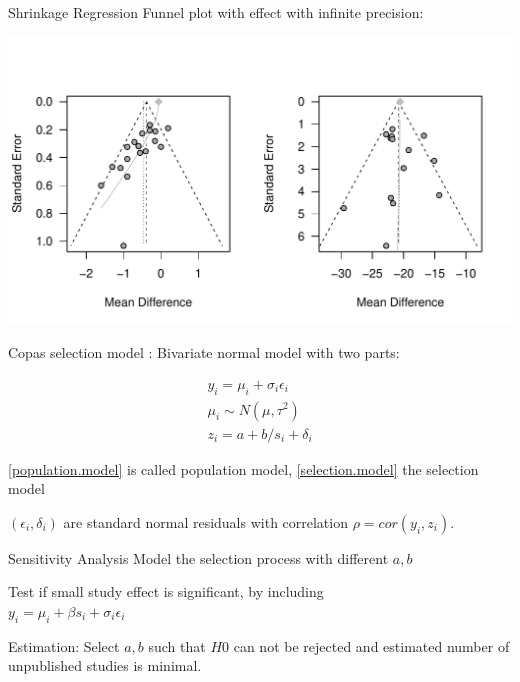 \documentclass[english]{beamer}\usepackage[]{graphicx}\usepackage[]{color}
\makeatletter
\def\maxwidth{ %
  \ifdim\Gin@nat@width>\linewidth
    \linewidth
  \else
    \Gin@nat@width
  \fi
}
\newenvironment{knitrout}{}{} %
\makeatother
\begin{document}
\begin{frame}[fragile]{Shrinkage Regression}
Funnel plot with effect with infinite precision:

\vspace{-1.1cm}
\begin{knitrout}
\color{fgcolor}
\includegraphics[width=\maxwidth]{figure/unnamed-chunk-11-1} 

\end{knitrout}
\end{frame}



\begin{frame}{Copas selection model}
\citet{Copas1}: Bivariate normal model with two parts:

\vspace{-8mm}
\begin{align}
y_{i} = \mu_{i} + \sigma_{i}\epsilon_{i} \label{population.model} \\
\mu_{i} \sim N(\mu, \tau^2) \label{population.model} \\
z_{i} = a + b/s_{i} + \delta_{i} \label{selection.model}
\end{align}

\ref{population.model} is called population model, \ref{selection.model} the selection model

$(\epsilon_{i}, \delta_{i})$ are standard normal residuals with correlation $\rho = cor(y_{i}, z_{i})$.
\end{frame}


\begin{frame}[fragile]{Sensitivity Analysis}
Model the selection process with different $a,b$

Test if small study effect is significant, by including \\ $y_{i} = \mu_{i} + \beta s_{i} + \sigma_{i}\epsilon_{i}$

Estimation: Select $a, b$ such that $H0$ can not be rejected and estimated
number of unpublished studies is minimal.
\end{frame}
\end{document}
